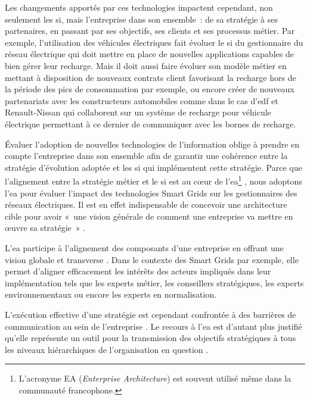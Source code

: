 Les changements apportés par ces technologies impactent cependant, non seulement 
les \gls{si}, mais l'entreprise dans son ensemble~: de sa stratégie à ses 
partenaires, en passant par ses objectifs, ses clients et ses processus métier. 
Par exemple, 
l'utilisation des véhicules électriques fait évoluer le \gls{si} du 
gestionnaire du réseau électrique qui doit mettre en place de nouvelles 
applications capables de bien gérer leur recharge. Mais il doit aussi faire 
évoluer son modèle métier en mettant à disposition de nouveaux contrats 
client favorisant la recharge hors de la période des pics de consommation par exemple, 
ou encore créer de nouveaux partenariats avec les constructeurs 
automobiles comme dans le cas d'\gls{edf} et Renault-Nissan qui collaborent sur 
un système de recharge pour véhicule électrique permettant à ce dernier de 
communiquer avec les bornes de recharge.

Évaluer l'adoption de nouvelles technologies de l'information oblige à prendre 
en compte l'entreprise dans son ensemble afin de garantir une cohérence entre 
la stratégie d'évolution adoptée et les \gls{si} qui implémentent cette 
stratégie. Parce que l'alignement entre la stratégie métier et le \gls{si} est 
au cœur de l'\gls{ea}\footnote{L'acronyme EA (\textit{Enterprise Architecture}) 
est souvent utilisé même dans la communauté francophone.} 
\cite{zachman1997enterprise}, nous
adoptons l'\gls{ea} pour évaluer l'impact des technologies Smart Grids sur les
gestionnaires des réseaux électriques. Il est en effet indispensable de
concevoir une architecture cible pour avoir  «~une vision générale de comment
une entreprise va mettre en œuvre sa stratégie~» \cite{ross2006enterprise}.

L'\gls{ea} participe à l'alignement des composants d'une entreprise en offrant 
une vision globale et transverse \cite{zachman1987framework}. Dans le contexte 
des 
Smart Grids par exemple, elle permet d'aligner efficacement les intérêts des 
acteurs impliqués dans leur implémentation tels que les experts métier, les 
conseillers stratégiques, les experts environnementaux ou encore les experts en 
normalisation.

L'exécution effective d'une stratégie est cependant confrontée à des barrières 
de communication au sein de l'entreprise \cite{vcater2010factors}. Le recours à 
l'\gls{ea} est d'autant plus justifié qu'elle représente un outil pour la 
transmission des objectifs stratégiques à tous les niveaux hiérarchiques de 
l'organisation en 
question \cite{kappelman2008enterprise}. 

